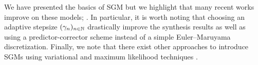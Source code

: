 We have presented the basics of SGM but we highlight that many recent works
improve on these models;
\citep[see e.g.][]{song2020score,song2020improved,song2020denoising,jolicoeur2020adversarial,jolicoeur2021gotta,nichol2021beatgans}. In
particular, it is worth noting that choosing an adaptive stepsize
$(\gamma_n)_{n \in \mathbb{N}}$ \citep{bao2022analyticdpm,watson2021learning} drastically improve the
synthesis results as well as using a predictor-corrector scheme
\citep{song2020score} instead of a simple Euler--Maruyama discretization. Finally,
we note that there exist other approaches to introduce SGMs using variational and maximum likelihood
techniques \citep{ho2020denoising,huang2021variational,durkan2021maximum}.


